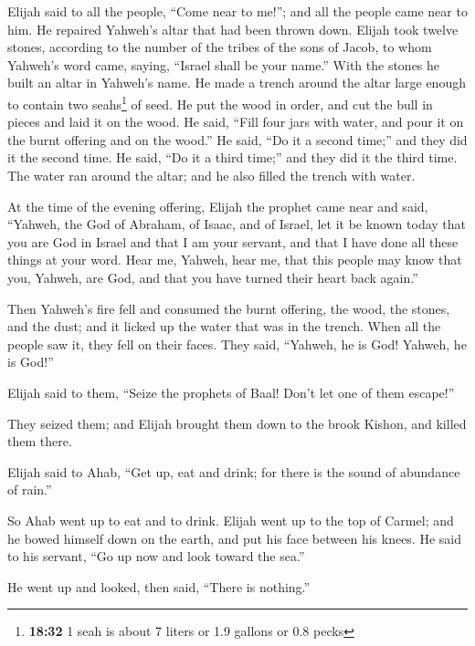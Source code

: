  Elijah said to all the people, ``Come near to me!''; and
all the people came near to him. He repaired Yahweh's altar that had
been thrown down.  Elijah took twelve stones, according
to the number of the tribes of the sons of Jacob, to whom Yahweh's word
came, saying, ``Israel shall be your name.''  With the
stones he built an altar in Yahweh's name. He made a trench around the
altar large enough to contain two seahs\footnote{\textbf{18:32} 1 seah
  is about 7 liters or 1.9 gallons or 0.8 pecks} of seed.
 He put the wood in order, and cut the bull in pieces and
laid it on the wood. He said, ``Fill four jars with water, and pour it
on the burnt offering and on the wood.''  He said, ``Do
it a second time;'' and they did it the second time. He said, ``Do it a
third time;'' and they did it the third time.  The water
ran around the altar; and he also filled the trench with water.

 At the time of the evening offering, Elijah the prophet
came near and said, ``Yahweh, the God of Abraham, of Isaac, and of
Israel, let it be known today that you are God in Israel and that I am
your servant, and that I have done all these things at your word.
 Hear me, Yahweh, hear me, that this people may know that
you, Yahweh, are God, and that you have turned their heart back again.''

 Then Yahweh's fire fell and consumed the burnt offering,
the wood, the stones, and the dust; and it licked up the water that was
in the trench.  When all the people saw it, they fell on
their faces. They said, ``Yahweh, he is God! Yahweh, he is God!''

 Elijah said to them, ``Seize the prophets of Baal! Don't
let one of them escape!''

They seized them; and Elijah brought them down to the brook Kishon, and
killed them there.

 Elijah said to Ahab, ``Get up, eat and drink; for there
is the sound of abundance of rain.''

 So Ahab went up to eat and to drink. Elijah went up to
the top of Carmel; and he bowed himself down on the earth, and put his
face between his knees.  He said to his servant, ``Go up
now and look toward the sea.''

He went up and looked, then said, ``There is nothing.''

